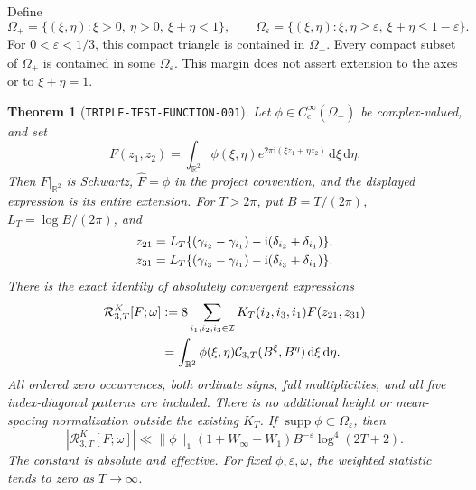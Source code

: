 \documentclass[11pt]{article}
\newtheorem{theorem}[lemma]{Theorem}
\newcommand{\ii}{\mathrm i}
\newcommand{\CT}{\mathcal C_{3,T}}
\newcommand{\dd}{\,\mathrm d}
\begin{document}
Define
\[
 \Omega_+=\{(\xi,\eta):\xi>0,\ \eta>0,\ \xi+\eta<1\},\qquad
 \Omega_\varepsilon=\{(\xi,\eta):\xi,\eta\geq\varepsilon,\
                                  \xi+\eta\leq1-\varepsilon\}.
\]
For \(0<\varepsilon<1/3\), this compact triangle is contained in
\(\Omega_+\). Every compact subset of \(\Omega_+\) is contained in
some \(\Omega_\varepsilon\). This margin does not assert extension to
the axes or to \(\xi+\eta=1\).

\begin{theorem}[\texttt{TRIPLE-TEST-FUNCTION-001}]
\label{thm:triple-test-function}
Let \(\phi\in C_c^\infty(\Omega_+)\) be complex-valued, and set
\begin{equation}\label{eq:triple-entire-test}
 F(z_1,z_2)=\int_{\mathbb R^2}\phi(\xi,\eta)
                   e^{2\pi\ii(\xi z_1+\eta z_2)}\dd\xi\dd\eta.
\end{equation}
Then \(F|_{\mathbb R^2}\) is Schwartz, \(\widehat F=\phi\) in the
project convention, and the displayed expression is its entire extension.
For \(T>2\pi\), put \(B=T/(2\pi)\), \(L_T=\log B/(2\pi)\), and
\begin{align}
 z_{21}&=L_T\{(\gamma_{i_2}-\gamma_{i_1})
                          -\ii(\delta_{i_2}+\delta_{i_1})\},\notag\\
 z_{31}&=L_T\{(\gamma_{i_3}-\gamma_{i_1})
                          -\ii(\delta_{i_3}+\delta_{i_1})\}.
 \label{eq:triple-test-arguments}
\end{align}
There is the exact identity of absolutely convergent expressions
\begin{align}
 \mathcal R^K_{3,T}[F;\omega]
 &:=8\sum_{i_1,i_2,i_3\in\mathcal I}
             K_T(i_2,i_3,i_1)F(z_{21},z_{31})\notag\\
 &=\int_{\mathbb R^2}\phi(\xi,\eta)
                      \CT(B^\xi,B^\eta)\dd\xi\dd\eta .
 \label{eq:triple-test-identity}
\end{align}
All ordered zero occurrences, both ordinate signs, full multiplicities,
and all five index-diagonal patterns are included. There is no additional
height or mean-spacing normalization outside the existing \(K_T\).
If \(\operatorname{supp}\phi\subset\Omega_\varepsilon\), then
\begin{equation}\label{eq:triple-test-bound}
 |\mathcal R^K_{3,T}[F;\omega]|
 \ll \|\phi\|_1(1+W_\infty+W_1)B^{-\varepsilon}\log^4(2T+2).
\end{equation}
The constant is absolute and effective. For fixed
\(\phi,\varepsilon,\omega\), the weighted statistic tends to zero as
\(T\to\infty\).
\end{theorem}
\end{document}
